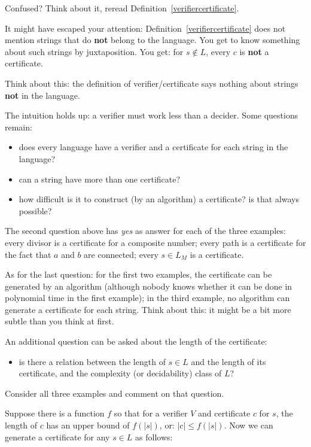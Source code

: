 Confused? Think about it, reread Definition~\ref{verifiercertificate}.

It might have escaped your attention:
Definition~\ref{verifiercertificate} does not mention strings that do
{\bf not} belong to the language. You get to know something about such
strings by juxtaposition. You get: for $s \notin L$, every $c$ is {\bf
not} a certificate.

Think about this: the definition of verifier/certificate says nothing
about strings {\bf not} in the language.

The intuition holds up: a verifier must work less than a decider. Some
questions remain:
\begin{itemize}
\item
does every language have a verifier and a certificate for each string
in the language?
\item
can a string have more than one certificate?
\item
how difficult is it to construct (by an algorithm) a certificate? is
that always possible?
\end{itemize}

The second question above has {\em yes} as answer for each of the
three examples: every divisor is a certificate for a composite number;
every path is a certificate for the fact that $a$ and $b$ are
connected; every $s \in L_M$ is a certificate.

As for the last question: for the first two examples, the certificate
can be generated by an algorithm (although nobody knows whether it can
be done in polynomial time in the first example); in the third
example, no algorithm can generate a certificate for each
string. Think about this: it might be a bit more subtle than you think
at first.

An additional question can be asked about the length of the certificate:
\begin{itemize}
\item
is there a relation between the length of $s \in L$ and the length of
its certificate, and the complexity (or decidability) class of $L$?
\end{itemize}
Consider all three examples and comment on that question.


Suppose there is a function $f$ so that for a verifier $V$ and
certificate $c$ for $s$, the length of $c$ has an upper bound of
$f(|s|)$, or:
%
$|c| \leq f(|s|)$. Now we can generate a certificate for
any $s \in L$ as follows:

\begin{algorithmic}
         \EndIf
    \EndFor
\end{algorithmic}

